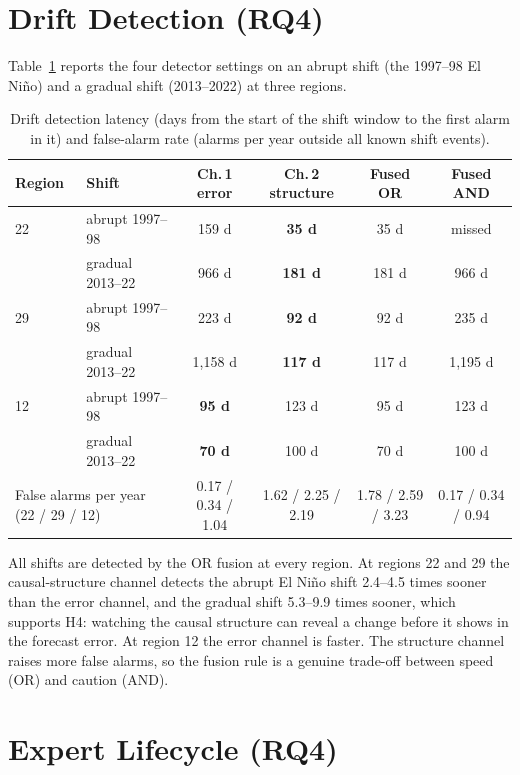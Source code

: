 \section{Drift Detection (RQ4)}
\label{sec:res-drift}

Table~\ref{tab:drift} reports the four detector settings on an abrupt shift (the 1997--98 El Ni\~{n}o) and a gradual shift (2013--2022) at three regions.

\begin{table}[htbp]
\centering
\caption{Drift detection latency (days from the start of the shift window to the first alarm in it) and false-alarm rate (alarms per year outside all known shift events).}
\label{tab:drift}
\scriptsize
\setlength{\tabcolsep}{3.5pt}
\begin{tabular}{llcccc}
\toprule
\textbf{Region} & \textbf{Shift} & \textbf{Ch.\,1 error} & \textbf{Ch.\,2 structure} & \textbf{Fused OR} & \textbf{Fused AND} \\
\midrule
22 & abrupt 1997--98 & 159 d & \textbf{35 d} & 35 d & missed \\
   & gradual 2013--22 & 966 d & \textbf{181 d} & 181 d & 966 d \\
29 & abrupt 1997--98 & 223 d & \textbf{92 d} & 92 d & 235 d \\
   & gradual 2013--22 & 1{,}158 d & \textbf{117 d} & 117 d & 1{,}195 d \\
12 & abrupt 1997--98 & \textbf{95 d} & 123 d & 95 d & 123 d \\
   & gradual 2013--22 & \textbf{70 d} & 100 d & 70 d & 100 d \\
\midrule
\multicolumn{2}{l}{False alarms per year (22 / 29 / 12)} & 0.17 / 0.34 / 1.04 & 1.62 / 2.25 / 2.19 & 1.78 / 2.59 / 3.23 & 0.17 / 0.34 / 0.94 \\
\bottomrule
\end{tabular}
\end{table}

All shifts are detected by the OR fusion at every region. At regions 22 and 29 the causal-structure channel detects the abrupt El Ni\~{n}o shift 2.4--4.5 times sooner than the error channel, and the gradual shift 5.3--9.9 times sooner, which supports H4: watching the causal structure can reveal a change before it shows in the forecast error. At region 12 the error channel is faster. The structure channel raises more false alarms, so the fusion rule is a genuine trade-off between speed (OR) and caution (AND).

\section{Expert Lifecycle (RQ4)}
\label{sec:res-lifecycle}

